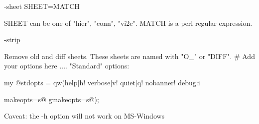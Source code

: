\documentclass[a4paper,12pt]{article}
\begin{document}
\begin{tt}-sheet SHEET=MATCH\end{tt}\newline
\hspace*{15mm}SHEET can be one of "hier", "conn", "vi2c". MATCH is\newline
\hspace*{15mm}a perl regular expression.\newline
\begin{tt}-strip\end{tt}\newline
\hspace*{15mm}Remove old and diff sheets. These sheets are named with "O\_" or "DIFF".\newline
\newline
\# Add your options here ....\newline
\newline
\newline
"Standard" options:\newline
\hspace*{15mm}\begin{tt}my @stdopts = qw(help|h! verbose|v! quiet|q! nobanner!  debug:i\end{tt}\newline
\hspace*{20mm}\begin{tt}makeopts=s@ gmakeopts=s@);\end{tt}\newline
Caveat: the -h option will not work on MS-Windows
\end{document}
